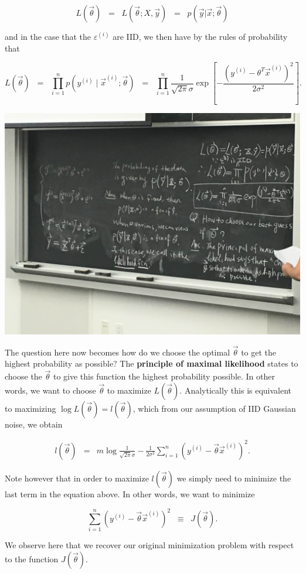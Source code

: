 \documentclass{article}
\begin{document}
\begin{equation*}
L(\vec{\theta}) \;\; =\;\; L(\vec{\theta}; X, \vec{y}) \;\; =\;\; p(\vec{y}| \vec{x}; \vec{\theta})
\end{equation*}

\noindent and in the case that the $\varepsilon^{(i)}$ are IID, we then have by the rules of probability that 

\begin{equation*}
L(\vec{\theta}) \;\; =\;\; \prod_{i=1}^n p(y^{(i)} \; | \; \vec{x}^{(i)}; \vec{\theta}) \;\; =\;\; \prod_{i=1}^n \frac{1}{\sqrt{2\pi} \sigma} \exp \left [ - \frac{(y^{(i)} - \theta^T \vec{x}^{(i)})^2}{2\sigma^2} \right ].
\end{equation*}

\vspace{1pc}
\centerline{\includegraphics[height=10cm]{LinReg05.JPG}}
\vspace{1pc}

\noindent The question here now becomes how do we choose the optimal $\vec{\theta}$ to get the highest probability as possible?  The \textbf{principle of maximal likelihood} states to choose the $\vec{\theta}$ to give this function the highest probability possible.  In other words, we want to choose $\vec{\theta}$ to maximize $L(\vec{\theta})$.  Analytically this is equivalent to maximizing $\log L(\vec{\theta}) = l(\vec{\theta})$, which from our assumption of IID Gaussian noise, we obtain

\begin{eqnarray*}
l(\vec{\theta}) & = & m \log \frac{1}{\sqrt{2\pi}\sigma} - \frac{1}{2\sigma^2} \sum_{i=1}^n (y^{(i)} - \vec{\theta} \vec{x}^{(i)} )^2.
\end{eqnarray*}

\noindent Note however that in order to maximize $l(\vec{\theta})$ we simply need to minimize the last term in the equation above.  In other words, we want to minimize

\begin{equation*}
\sum_{i=1}^n (y^{(i)} - \vec{\theta} \vec{x}^{(i)})^2 \;\; \equiv \;\; J(\vec{\theta}).
\end{equation*}

\noindent We observe here that we recover our original minimization problem with respect to the function $J(\vec{\theta})$.  
\end{document}
